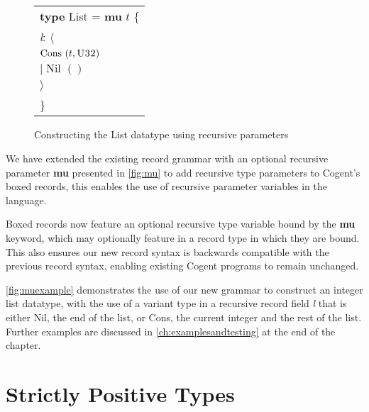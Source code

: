\begin{figure}
    \centering
    \begin{tabular}{l}
        \textbf{type} List = \textbf{mu} $t$ \{ \\
            \phantom{x}\hspace{2em}\textit{l}: $\langle\;$ \\
            \phantom{x}\hspace{4em} $\text{Cons } (t,\textsc{U32})\;$ \\
            \phantom{x}\hspace{3.7em}$|\; \text{Nil } ()\;$ \\
            \phantom{x}\hspace{2em}$\rangle$ \\
        \} 
    \end{tabular}
    \vspace{2em}
    \caption{Constructing the List datatype using recursive parameters}
    \label{fig:muexample}
\end{figure}

We have extended the existing record grammar with an optional recursive parameter \textbf{mu} presented in
\autoref{fig:mu} to add recursive type parameters to Cogent's boxed records, this enables the use
of recursive parameter variables in the language.

Boxed records now feature an optional recursive type variable bound by the \textbf{mu} keyword, which may
optionally feature in a record type in which they are bound. This also ensures our new record syntax is
backwards compatible with the previous record syntax, enabling existing Cogent programs to remain unchanged.

\autoref{fig:muexample} demonstrates the use of our new grammar to construct an integer list datatype,
with the use of a variant type in a recursive record field \textit{l} that is either Nil,
the end of the list, or Cons, the current integer and the rest of the list. Further
examples are discussed in \autoref{ch:examplesandtesting} at the end of the chapter.

\section{Strictly Positive Types}

